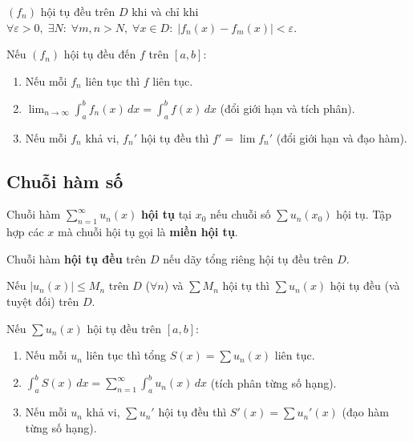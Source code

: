 \documentclass[12pt,a4paper]{article}
\begin{document}
\begin{dinhly}[title={Tiêu chuẩn Cauchy về hội tụ đều}]
  $(f_n)$ hội tụ đều trên $D$ khi và chỉ khi $\forall \varepsilon > 0,\; \exists N:\; \forall m, n > N,\; \forall x \in D:\; |f_n(x) - f_m(x)| < \varepsilon$.
\end{dinhly}

\begin{tinhchat}[title={Tính chất dãy hàm hội tụ đều}]
  Nếu $(f_n)$ hội tụ đều đến $f$ trên $[a,b]$:
  \begin{enumerate}
    \item Nếu mỗi $f_n$ liên tục thì $f$ liên tục.
    \item $\displaystyle\lim_{n \to \infty} \int_a^b f_n(x)\,dx = \int_a^b f(x)\,dx$ (đổi giới hạn và tích phân).
    \item Nếu mỗi $f_n$ khả vi, $f_n'$ hội tụ đều thì $f' = \lim f_n'$ (đổi giới hạn và đạo hàm).
  \end{enumerate}
\end{tinhchat}

\subsection{Chuỗi hàm số}

\begin{dinhnghia}
  Chuỗi hàm $\displaystyle\sum_{n=1}^{\infty} u_n(x)$ \textbf{hội tụ} tại $x_0$ nếu chuỗi số $\sum u_n(x_0)$ hội tụ. Tập hợp các $x$ mà chuỗi hội tụ gọi là \textbf{miền hội tụ}.

  Chuỗi hàm \textbf{hội tụ đều} trên $D$ nếu dãy tổng riêng hội tụ đều trên $D$.
\end{dinhnghia}

\begin{dinhly}[title={Tiêu chuẩn Weierstrass (so sánh hội tụ đều)}]
  Nếu $|u_n(x)| \le M_n$ trên $D$ ($\forall n$) và $\sum M_n$ hội tụ thì $\sum u_n(x)$ hội tụ đều (và tuyệt đối) trên $D$.
\end{dinhly}

\begin{tinhchat}[title={Tính chất chuỗi hàm hội tụ đều}]
  Nếu $\sum u_n(x)$ hội tụ đều trên $[a,b]$:
  \begin{enumerate}
    \item Nếu mỗi $u_n$ liên tục thì tổng $S(x) = \sum u_n(x)$ liên tục.
    \item $\displaystyle\int_a^b S(x)\,dx = \sum_{n=1}^{\infty} \int_a^b u_n(x)\,dx$ (tích phân từng số hạng).
    \item Nếu mỗi $u_n$ khả vi, $\sum u_n'$ hội tụ đều thì $S'(x) = \sum u_n'(x)$ (đạo hàm từng số hạng).
  \end{enumerate}
\end{tinhchat}
\end{document}
